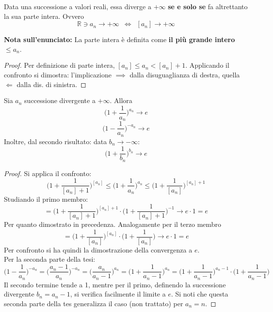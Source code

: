 \documentclass[10pt, oneside]{book}
\theoremstyle{plain}
\begin{document}
\begin{prop}
    Data una successione a valori reali, essa diverge a $+\infty$ \textbf{se e solo se} fa altrettanto la sua parte intera. Ovvero
    \[\mathbb{R} \owns a_n \rightarrow +\infty \enspace \Leftrightarrow \enspace [a_n] \rightarrow +\infty\]
\end{prop}
\textbf{Nota sull'enunciato: } La parte intera è definita come \textbf{il più grande intero} $\leq a_n$.
\begin{proof}
    Per definizione di parte intera, $[a_n] \leq a_n < [a_n] + 1$. Applicando il confronto si dimostra: l'implicazione $\implies$ dalla disuguaglianza di destra, quella $\Leftarrow$ dalla dis. di sinistra.
\end{proof}
\begin{prop}
    Sia $a_n$ successione divergente a $+\infty$. Allora
    \[\bigg(1 + \frac{1}{a_n}\bigg)^{a_n} \longrightarrow e\]
    \[\bigg(1 - \frac{1}{a_n}\bigg)^{-a_n} \longrightarrow e\]
    Inoltre, dal secondo risultato: data $b_n \rightarrow - \infty$:
     \[\bigg(1 + \frac{1}{b_n}\bigg)^{b_n} \longrightarrow e\]
\end{prop}
\begin{proof}
    Si applica il confronto:
    \[\bigg(1 + \frac{1}{[a_n]+1}\bigg)^{[a_n]} \leq \bigg(1 + \frac{1}{a_n}\bigg)^{a_n} \leq \bigg(1 + \frac{1}{[a_n]}\bigg)^{[a_n]+1}\]
    Studiando il primo membro:
    \[= \bigg(1 + \frac{1}{[a_n]+1}\bigg)^{[a_n]+1}\cdot \bigg(1 + \frac{1}{[a_n]+1}\bigg)^{-1} \rightarrow e \cdot 1 = e\]
    Per quanto dimostrato in precedenza. Analogamente per il terzo membro 
    \[= \bigg(1 + \frac{1}{[a_n]}\bigg)^{[a_n]} \cdot \bigg(1 + \frac{1}{[a_n]}\bigg) \rightarrow e \cdot 1 = e\]
    Per confronto si ha quindi la dimostrazione della convergenza a $e$.
    \\Per la seconda parte della tesi:
    \[\bigg(1 - \frac{1}{a_n}\bigg)^{-a_n} = \bigg(\frac{a_n - 1}{a_n}\bigg)^{-a_n} = \bigg(\frac{a_n}{a_n -1}\bigg)^{a_n} = \bigg(1+\frac{1}{a_n -1}\bigg)^{a_n} = \bigg(1+\frac{1}{a_n -1}\bigg)^{a_n-1} \cdot \bigg(1+\frac{1}{a_n -1}\bigg) \]
    Il secondo termine tende a 1, mentre per il primo, definendo la successione divergente $b_n = a_n - 1$, si verifica facilmente il limite a $e$. Si noti che questa seconda parte della tes generalizza il caso (non trattato) per $a_n = n$.
\end{proof}
\end{document}

